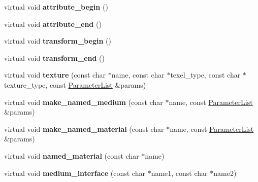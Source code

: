 \begin{DoxyCompactItemize}
\item 
\mbox{\label{structpbrt_1_1_echo_importer_a0c84f341fd3a9b862276e5bd8684a411}} 
virtual void {\bfseries attribute\+\_\+begin} ()
\item 
\mbox{\label{structpbrt_1_1_echo_importer_abf03653ce4d377bd49359621d8615c67}} 
virtual void {\bfseries attribute\+\_\+end} ()
\item 
\mbox{\label{structpbrt_1_1_echo_importer_ac8358d032cc7e0e1743e9e98ffcdf463}} 
virtual void {\bfseries transform\+\_\+begin} ()
\item 
\mbox{\label{structpbrt_1_1_echo_importer_ac82b149698ff9cddde3aea8fd5d1b85d}} 
virtual void {\bfseries transform\+\_\+end} ()
\item 
\mbox{\label{structpbrt_1_1_echo_importer_abc340415115bde0708d72e7f4a38959c}} 
virtual void {\bfseries texture} (const char $\ast$name, const char $\ast$texel\+\_\+type, const char $\ast$texture\+\_\+type, const \hyperlink{structpbrt_1_1_parameter_list}{Parameter\+List} \&params)
\item 
\mbox{\label{structpbrt_1_1_echo_importer_aa3a973352a7cfb5b38010cd76dc7528c}} 
virtual void {\bfseries make\+\_\+named\+\_\+medium} (const char $\ast$name, const \hyperlink{structpbrt_1_1_parameter_list}{Parameter\+List} \&params)
\item 
\mbox{\label{structpbrt_1_1_echo_importer_a6550495922b983e58ffd20c42bd8ecf4}} 
virtual void {\bfseries make\+\_\+named\+\_\+material} (const char $\ast$name, const \hyperlink{structpbrt_1_1_parameter_list}{Parameter\+List} \&params)
\item 
\mbox{\label{structpbrt_1_1_echo_importer_ac60fff9aa00105c9cb465860e6419192}} 
virtual void {\bfseries named\+\_\+material} (const char $\ast$name)
\item 
\mbox{\label{structpbrt_1_1_echo_importer_afb3070a95fd3e3d3997b67c8ddf2f843}} 
virtual void {\bfseries medium\+\_\+interface} (const char $\ast$name1, const char $\ast$name2)

\end{DoxyCompactItemize}
